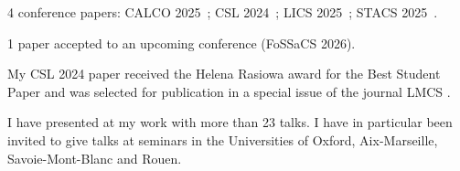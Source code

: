 4 conference papers: CALCO
2025~\cite{aristoteActiveLearningUpwardClosed2025}; CSL
2024~\cite{aristoteActiveLearningDeterministic2024}; LICS
2025~\cite{aristoteMonotoneWeakDistributive2025}; STACS
2025~\cite{aristoteLearningWeightedAutomata2025}.

1 paper
accepted to an upcoming conference (FoSSaCS 2026).

\medskip

My CSL 2024 paper \cite{aristoteActiveLearningDeterministic2024} received the
Helena Rasiowa award for the Best Student Paper and was selected for publication
in a special issue of the journal LMCS
\cite{aristoteActiveLearningDeterministic2025}.

I have presented at my work with more than 23 talks. I have in particular been
invited to give talks at seminars in the Universities of Oxford, Aix-Marseille,
Savoie-Mont-Blanc and Rouen.

